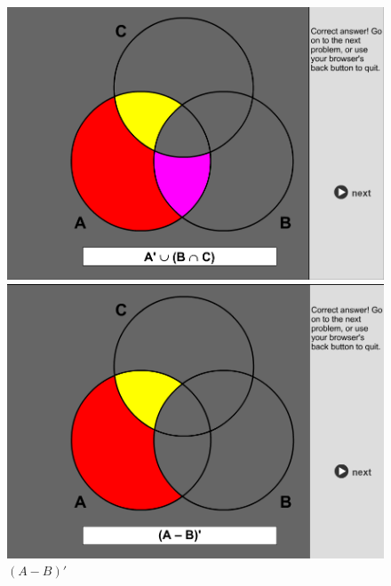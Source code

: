 \documentclass[12pt,en,a4paper]{article}
\begin{document}
	\begin{figure}[ht]
		\begin{minipage}{0.5\textwidth}
			\includegraphics[width=1.0\textwidth]{SOL_set_1_5.png}
			\caption*{$A \prime \cup (B \cap C)$}
			\label{fig:prob_1_5}
		\end{minipage}
		\begin{minipage}{0.5\textwidth}
			\includegraphics[width=1.0\textwidth]{SOL_set_1_6.png}
			\caption*{$(A-B) \prime$}
			\label{fig:prob_1_6}
		\end{minipage}
	\end{figure}
\end{document}
